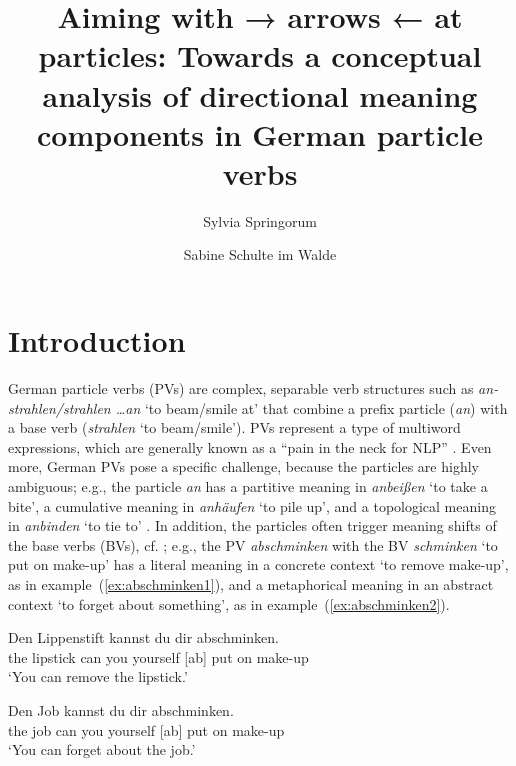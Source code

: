 \documentclass[output=paper]{langsci/langscibook}
\title{Aiming with → arrows ← at
  particles: Towards a conceptual analysis of directional meaning
  components in German particle verbs}
\author{%
  Sylvia Springorum\affiliation{Institut für Maschinelle Sprachverarbeitung, Universität Stuttgart}\and 
  Sabine Schulte im Walde\affiliation{Institut für Maschinelle Sprachverarbeitung, Universität Stuttgart}
}
\begin{document}
\maketitle


\clearpage
\section{Introduction}

German particle verbs (PVs) are complex, separable verb structures such as
\textit{an- strahlen/strahlen \ldots an} `to beam/smile at' that combine a prefix particle
(\textit{an}) with a base verb (\textit{strahlen} `to
beam/smile'). PVs
represent a type of multiword expressions, which are generally known
as a ``pain in the neck for NLP'' \citep{SagEtAl:02}. Even
more, German PVs pose a specific challenge, because the particles are
highly ambiguous; e.g., the particle \textit{an} has a partitive
meaning in \textit{anbeißen} `to take a bite', a cumulative meaning in
\textit{anhäufen} `to pile up', and a topological meaning in
\textit{anbinden} `to tie to' \citep{Springorum:11ALTER}. In addition, the
particles often trigger meaning shifts of the base verbs (BVs),
cf. \citet{SpringorumEtAl:13,FrassinelliEtAl:17ALTER,Koeper/SchulteImWalde:18ALTER,SchulteImWaldeEtAl:18ALTER};
e.g., the PV \textit{abschminken} with the BV \textit{schminken} `to
put on make-up' has a literal meaning in a concrete context `to
remove make-up', as in example~(\ref{ex:abschminken1}), and a
metaphorical meaning in an abstract context `to forget about
something', as in example~(\ref{ex:abschminken2}).

\ea\label{ex:abschminken1}
\gll Den Lippenstift kannst du dir abschminken.\\
the lipstick can you yourself {[ab] put on make-up}\\
\glt `You can remove the lipstick.'
\z

\ea\label{ex:abschminken2}
\gll Den Job kannst du dir abschminken.\\
the job can you yourself {[ab] put on make-up}\\
\glt `You can forget about the job.'
\z

%
\end{document}
